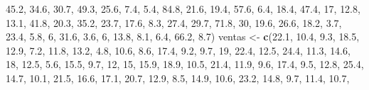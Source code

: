 \documentclass[]{book}
\newenvironment{Shaded}{\begin{snugshade}}{\end{snugshade}}
\newcommand{\KeywordTok}[1]{\textcolor[rgb]{0.13,0.29,0.53}{\textbf{#1}}}
\newcommand{\DecValTok}[1]{\textcolor[rgb]{0.00,0.00,0.81}{#1}}
\newcommand{\FloatTok}[1]{\textcolor[rgb]{0.00,0.00,0.81}{#1}}
\newcommand{\StringTok}[1]{\textcolor[rgb]{0.31,0.60,0.02}{#1}}
\newcommand{\NormalTok}[1]{#1}
\begin{document}
\begin{Shaded}
\begin{Highlighting}[]
    \FloatTok{45.2}\NormalTok{, }\FloatTok{34.6}\NormalTok{, }\FloatTok{30.7}\NormalTok{, }\FloatTok{49.3}\NormalTok{, }\FloatTok{25.6}\NormalTok{, }\FloatTok{7.4}\NormalTok{, }\FloatTok{5.4}\NormalTok{, }\FloatTok{84.8}\NormalTok{, }\FloatTok{21.6}\NormalTok{, }\FloatTok{19.4}\NormalTok{, }\FloatTok{57.6}\NormalTok{, }\FloatTok{6.4}\NormalTok{, }\FloatTok{18.4}\NormalTok{, }
    \FloatTok{47.4}\NormalTok{, }\DecValTok{17}\NormalTok{, }\FloatTok{12.8}\NormalTok{, }\FloatTok{13.1}\NormalTok{, }\FloatTok{41.8}\NormalTok{, }\FloatTok{20.3}\NormalTok{, }\FloatTok{35.2}\NormalTok{, }\FloatTok{23.7}\NormalTok{, }\FloatTok{17.6}\NormalTok{, }\FloatTok{8.3}\NormalTok{, }\FloatTok{27.4}\NormalTok{, }\FloatTok{29.7}\NormalTok{, }\FloatTok{71.8}\NormalTok{, }
    \DecValTok{30}\NormalTok{, }\FloatTok{19.6}\NormalTok{, }\FloatTok{26.6}\NormalTok{, }\FloatTok{18.2}\NormalTok{, }\FloatTok{3.7}\NormalTok{, }\FloatTok{23.4}\NormalTok{, }\FloatTok{5.8}\NormalTok{, }\DecValTok{6}\NormalTok{, }\FloatTok{31.6}\NormalTok{, }\FloatTok{3.6}\NormalTok{, }\DecValTok{6}\NormalTok{, }\FloatTok{13.8}\NormalTok{, }\FloatTok{8.1}\NormalTok{, }\FloatTok{6.4}\NormalTok{, }\FloatTok{66.2}\NormalTok{, }
    \FloatTok{8.7}\NormalTok{)}
\NormalTok{ventas <-}\StringTok{ }\KeywordTok{c}\NormalTok{(}\FloatTok{22.1}\NormalTok{, }\FloatTok{10.4}\NormalTok{, }\FloatTok{9.3}\NormalTok{, }\FloatTok{18.5}\NormalTok{, }\FloatTok{12.9}\NormalTok{, }\FloatTok{7.2}\NormalTok{, }\FloatTok{11.8}\NormalTok{, }\FloatTok{13.2}\NormalTok{, }\FloatTok{4.8}\NormalTok{, }\FloatTok{10.6}\NormalTok{, }\FloatTok{8.6}\NormalTok{, }\FloatTok{17.4}\NormalTok{, }
    \FloatTok{9.2}\NormalTok{, }\FloatTok{9.7}\NormalTok{, }\DecValTok{19}\NormalTok{, }\FloatTok{22.4}\NormalTok{, }\FloatTok{12.5}\NormalTok{, }\FloatTok{24.4}\NormalTok{, }\FloatTok{11.3}\NormalTok{, }\FloatTok{14.6}\NormalTok{, }\DecValTok{18}\NormalTok{, }\FloatTok{12.5}\NormalTok{, }\FloatTok{5.6}\NormalTok{, }\FloatTok{15.5}\NormalTok{, }\FloatTok{9.7}\NormalTok{, }\DecValTok{12}\NormalTok{, }
    \DecValTok{15}\NormalTok{, }\FloatTok{15.9}\NormalTok{, }\FloatTok{18.9}\NormalTok{, }\FloatTok{10.5}\NormalTok{, }\FloatTok{21.4}\NormalTok{, }\FloatTok{11.9}\NormalTok{, }\FloatTok{9.6}\NormalTok{, }\FloatTok{17.4}\NormalTok{, }\FloatTok{9.5}\NormalTok{, }\FloatTok{12.8}\NormalTok{, }\FloatTok{25.4}\NormalTok{, }\FloatTok{14.7}\NormalTok{, }\FloatTok{10.1}\NormalTok{, }
    \FloatTok{21.5}\NormalTok{, }\FloatTok{16.6}\NormalTok{, }\FloatTok{17.1}\NormalTok{, }\FloatTok{20.7}\NormalTok{, }\FloatTok{12.9}\NormalTok{, }\FloatTok{8.5}\NormalTok{, }\FloatTok{14.9}\NormalTok{, }\FloatTok{10.6}\NormalTok{, }\FloatTok{23.2}\NormalTok{, }\FloatTok{14.8}\NormalTok{, }\FloatTok{9.7}\NormalTok{, }\FloatTok{11.4}\NormalTok{, }\FloatTok{10.7}\NormalTok{, }

\end{Highlighting}
\end{Shaded}
\end{document}
